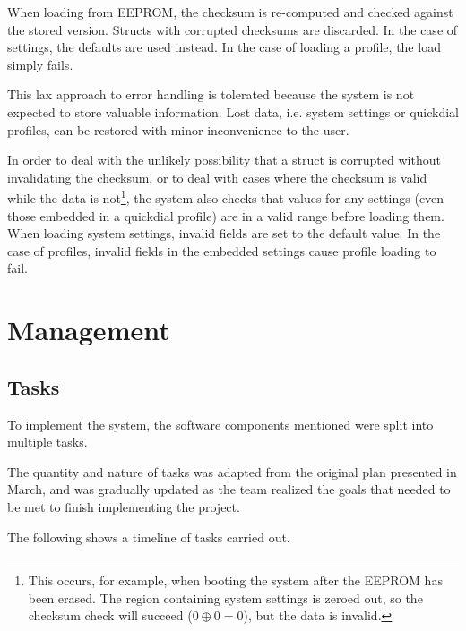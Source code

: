 \documentclass[11pt,a4paper,twocolumn]{scrartcl}
\begin{document}
When loading from EEPROM, the checksum is re-computed and checked against the stored version. Structs with corrupted checksums are discarded. In the case of settings, the defaults are used instead. In the case of loading a profile, the load simply fails.

This lax approach to error handling is tolerated because the system is not expected to store valuable information. Lost data, i.e. system settings or quickdial profiles, can be restored with minor inconvenience to the user.

In order to deal with the unlikely possibility that a struct is corrupted without invalidating the checksum, or to deal with cases where the checksum is valid while the data is not\footnote{This occurs, for example, when booting the system after the EEPROM has been erased. The region containing system settings is zeroed out, so the checksum check will succeed ($0 \oplus 0 = 0$), but the data is invalid.}, the system also checks that values for any settings (even those embedded in a quickdial profile) are in a valid range before loading them. When loading system settings, invalid fields are set to the default value. In the case of profiles, invalid fields in the embedded settings cause profile loading to fail.

\section{Management} \label{schedule}

\subsection{Tasks}
To implement the system, the software components mentioned were split into multiple tasks. 

The quantity and nature of tasks was adapted from the original plan presented in March, and was gradually updated as the team realized the goals that needed to be met to finish implementing the project.

The following shows a timeline of tasks carried out.
\end{document}
